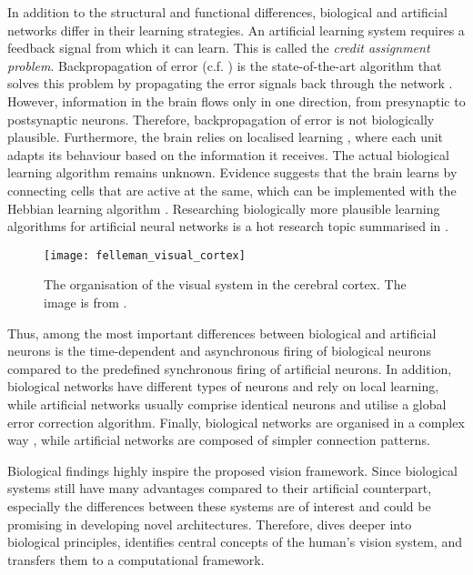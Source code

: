 In addition to the structural and functional differences, biological and artificial networks differ in their learning strategies.
An artificial learning system requires a feedback signal from which it can learn.
This is called the \emph{credit assignment problem}.
Backpropagation of error (c.f. ) is the state-of-the-art algorithm that solves this problem by propagating the error signals back through the network .
However, information in the brain flows only in one direction, from presynaptic to postsynaptic neurons.
Therefore, backpropagation of error is not biologically plausible.
Furthermore, the brain relies on localised learning , where each unit adapts its behaviour based on the information it receives.
The actual biological learning algorithm remains unknown. Evidence suggests that the brain learns by connecting cells that are active at the same, which can be implemented with the Hebbian learning algorithm .
Researching biologically more plausible learning algorithms for artificial neural networks is a hot research topic summarised in .

\begin{figure}[h]
    \centering
    \texttt{[image: felleman\_visual\_cortex]}
    \caption[Organisation of the visual system in the cerebral cortex]{The organisation of the visual system in the cerebral cortex. The image is from .}
\end{figure}

Thus, among the most important differences between biological and artificial neurons is the time-dependent and asynchronous firing of biological neurons compared to the predefined synchronous firing of artificial neurons. In addition, biological networks have different types of neurons and rely on local learning, while artificial networks usually comprise identical neurons and utilise a global error correction algorithm. Finally, biological networks are organised in a complex way , while artificial networks are composed of simpler connection patterns.

Biological findings highly inspire the proposed vision framework.
Since biological systems still have many advantages compared to their artificial counterpart, especially the differences between these systems are of interest and could be promising in developing novel architectures.
Therefore,  dives deeper into biological principles, identifies central concepts of the human's vision system, and transfers them to a computational framework.

